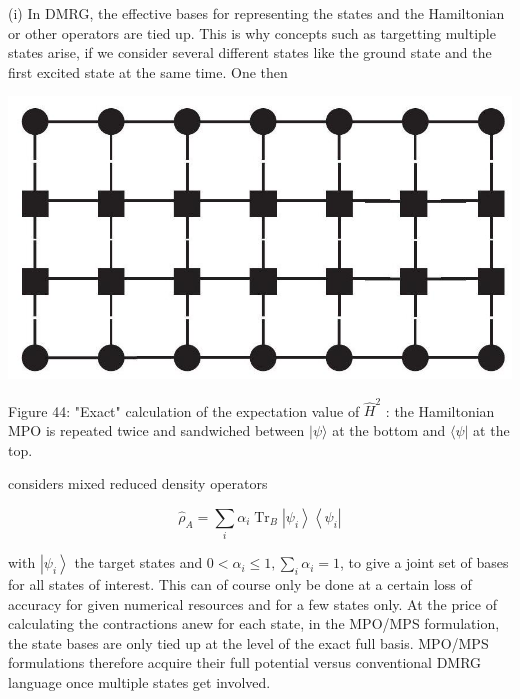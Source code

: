 \documentclass[12pt]{article}
\begin{document}
(i) In DMRG, the effective bases for representing the states and the Hamiltonian or other operators are tied up. This is why concepts such as targetting multiple states arise, if we consider several different states like the ground state and the first excited state at the same time. One then

\begin{center}
\includegraphics[max width=\textwidth]{2024_05_04_afc4ad226da9ccfe0ac8g-074}
\end{center}

Figure 44: "Exact" calculation of the expectation value of $\hat{H}^{2}$ : the Hamiltonian MPO is repeated twice and sandwiched between $|\psi\rangle$ at the bottom and $\langle\psi|$ at the top.

considers mixed reduced density operators


\begin{equation*}
\hat{\rho}_{A}=\sum_{i} \alpha_{i} \operatorname{Tr}_{B}\left|\psi_{i}\right\rangle\left\langle\psi_{i}\right| \tag{225}
\end{equation*}


with $\left|\psi_{i}\right\rangle$ the target states and $0<\alpha_{i} \leq 1, \sum_{i} \alpha_{i}=1$, to give a joint set of bases for all states of interest. This can of course only be done at a certain loss of accuracy for given numerical resources and for a few states only. At the price of calculating the contractions anew for each state, in the MPO/MPS formulation, the state bases are only tied up at the level of the exact full basis. MPO/MPS formulations therefore acquire their full potential versus conventional DMRG language once multiple states get involved.
\end{document}
